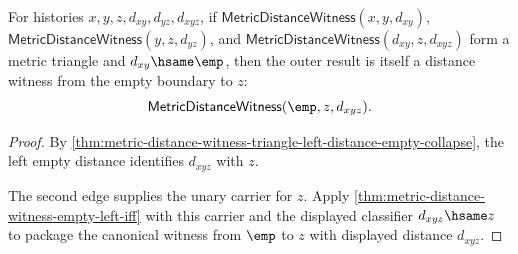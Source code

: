 \begin{theorem}
\label{thm:metric-distance-witness-triangle-left-empty-boundary-witness}
For histories $x,y,z,d_{xy},d_{yz},d_{xyz}$, if
$\mathsf{MetricDistanceWitness}(x,y,d_{xy})$,
$\mathsf{MetricDistanceWitness}(y,z,d_{yz})$, and
$\mathsf{MetricDistanceWitness}(d_{xy},z,d_{xyz})$ form a metric triangle and
$d_{xy}\hsame\emp$, then the outer result is itself a distance witness from
the empty boundary to $z$:
$$
\mathsf{MetricDistanceWitness}(\emp,z,d_{xyz}).
$$
\end{theorem}
\begin{proof}
By \autoref{thm:metric-distance-witness-triangle-left-distance-empty-collapse},
the left empty distance identifies $d_{xyz}$ with $z$.

The second edge supplies the unary carrier for $z$. Apply
\autoref{thm:metric-distance-witness-empty-left-iff} with this carrier and the
displayed classifier $d_{xyz}\hsame z$ to package the canonical witness from
$\emp$ to $z$ with displayed distance $d_{xyz}$.
\end{proof}

